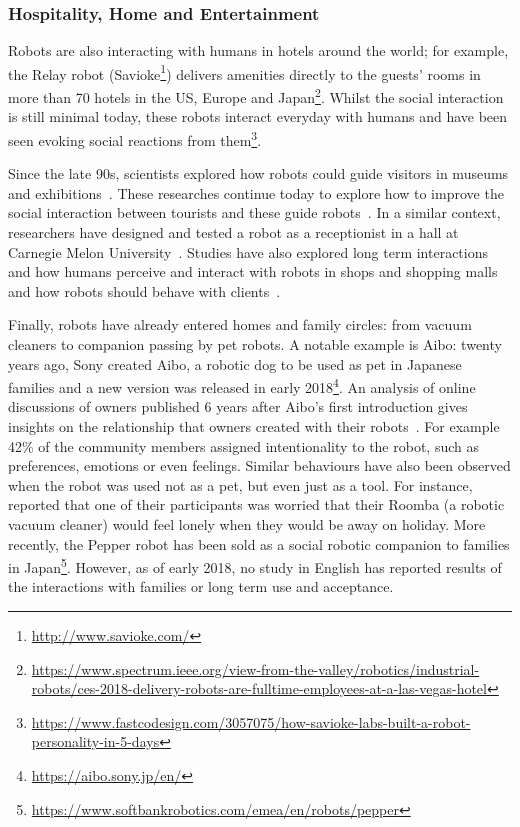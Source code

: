 \subsubsection{Hospitality, Home and Entertainment} 
	
	Robots are also interacting with humans in hotels around the world; for example, the Relay robot (Savioke\footnote{\url{http://www.savioke.com/}}) delivers amenities directly to the guests' rooms in more than 70 hotels in the US, Europe and Japan\footnote{\url{https://www.spectrum.ieee.org/view-from-the-valley/robotics/industrial-robots/ces-2018-delivery-robots-are-fulltime-employees-at-a-las-vegas-hotel}}. Whilst the social interaction is still minimal today, these robots interact everyday with humans and have been seen evoking social reactions from them\footnote{\url{https://www.fastcodesign.com/3057075/how-savioke-labs-built-a-robot-personality-in-5-days}}. 
	
	Since the late 90s, scientists explored how robots could guide visitors in museums and exhibitions~\citep{thrun1999minerva,burgard1999experiences}. These researches continue today to explore how to improve the social interaction between tourists and these guide robots~\citep{bennewitz2005towards}. In a similar context, researchers have designed and tested a robot as a receptionist in a hall at Carnegie Melon University~\citep{gockley2005designing}. Studies have also explored long term interactions and how humans perceive and interact with robots in shops and shopping malls~\citep{kanda2009affective} and how robots should behave with clients~\citep{kanda2008will}.

    Finally, robots have already entered homes and family circles: from vacuum cleaners to companion passing by pet robots. A notable example is Aibo: twenty years ago, Sony created Aibo, a robotic dog to be used as pet in Japanese families and a new version was released in early 2018\footnote{\url{https://aibo.sony.jp/en/}}. An analysis of online discussions of owners published 6 years after Aibo's first introduction gives insights on the relationship that owners created with their robots~\citep{friedman2003hardware}. For example 42\% of the community members assigned intentionality to the robot, such as preferences, emotions or even feelings. Similar behaviours have also been observed when the robot was used not as a pet, but even just as a tool. For instance, \cite{fink2013living} reported that one of their participants was worried that their Roomba (a robotic vacuum cleaner) would feel lonely when they would be away on holiday. More recently, the Pepper robot has been sold as a social robotic companion to families in Japan\footnote{\url{https://www.softbankrobotics.com/emea/en/robots/pepper}}. However, as of early 2018, no study in English has reported results of the interactions with families or long term use and acceptance.
    
